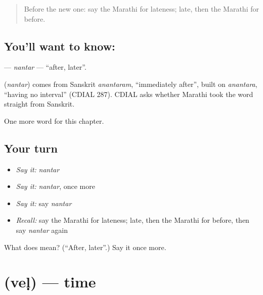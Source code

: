\label{lesson:MR-C111-nantar}



\begin{quote}
Before the new one: say the Marathi for lateness; late, then the Marathi for before.
\end{quote}

\subsection*{You'll want to know: }
\textbf{} — \emph{nantar} — \textquotedblleft{}after, later\textquotedblright{}.

\begin{cousinweb}
\textbf{} (\emph{nantar}) comes from Sanskrit \emph{anantaram}, \textquotedblleft{}immediately after\textquotedblright{}, built on \emph{anantara}, \textquotedblleft{}having no interval\textquotedblright{} (CDIAL 287). CDIAL asks whether Marathi took the word straight from Sanskrit.
\end{cousinweb}

\begin{grammarlens}[title={What you've built}]
One more word for this chapter.
\end{grammarlens}

\subsection*{Your turn}
\begin{itemize}
\raggedright
  \item \emph{Say it:} \emph{nantar}
  \item \emph{Say it:} \emph{nantar}, once more
  \item \emph{Say it:} say \emph{nantar}
  \item \emph{Recall:} say the Marathi for lateness; late, then the Marathi for before, then say \emph{nantar} again
\end{itemize}

\begin{tcolorbox}[breakable,colback=teal!4,colframe=teal!35!black,title={Before you move on}]
What does  mean? (\textquotedblleft{}After, later\textquotedblright{}.) Say it once more.
\end{tcolorbox}
\section[\texorpdfstring{\mr{वेळ} (veḷ)}{वेळ (veḷ)}]{ (veḷ) — time}

